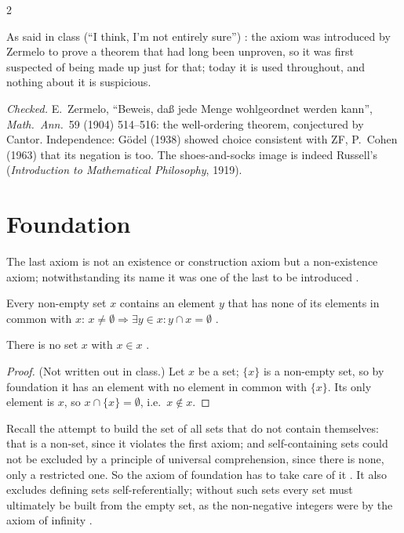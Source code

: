 \begin{paracol}{2}
\begin{history}
As said in class (``I think, I'm not entirely sure'') : the axiom was introduced by
Zermelo to prove a theorem that had long been unproven, so it was first suspected of being made up just for that;
today it is used throughout, and nothing about it is suspicious.\par
\smallskip
\emph{Checked.} E.~Zermelo, ``Beweis, da\ss{} jede Menge wohlgeordnet werden kann'', \emph{Math.\ Ann.}\ 59 (1904)
514--516: the well-ordering theorem, conjectured by Cantor. Independence: G\"odel (1938) showed choice consistent with
ZF, P.~Cohen (1963) that its negation is too. The shoes-and-socks image is indeed Russell's (\emph{Introduction to
Mathematical Philosophy}, 1919).
\end{history}

\section{Foundation}\label{sec:se-foundation}

The last axiom is not an existence or construction axiom but a non-existence axiom; notwithstanding its name it was
one of the last to be introduced .

\begin{definition}\label{ax:se-foundation}
Every non-empty set $x$ contains an element $y$ that has none of its elements in common with $x$:
$x\ne\emptyset\Rightarrow\exists y\in x\colon y\cap x=\emptyset$ .
\end{definition}

\begin{corollary}\label{cor:se-no-self}
There is no set $x$ with $x\in x$ .
\end{corollary}
\begin{proof}
(Not written out in class.) Let $x$ be a set; $\{x\}$ is a non-empty set, so by foundation it has an element with no
element in common with $\{x\}$. Its only element is $x$, so $x\cap\{x\}=\emptyset$, i.e.\ $x\notin x$.
\end{proof}
Recall the attempt to build the set of all sets that do not contain themselves: that is a non-set, since it violates
the first axiom; and self-containing sets could not be excluded by a principle of universal comprehension, since
there is none, only a restricted one. So the axiom of foundation has to take care of it
. It also excludes defining sets self-referentially; without such sets
every set must ultimately be built from the empty set, as the non-negative integers were by the axiom of infinity
.


\end{paracol}
